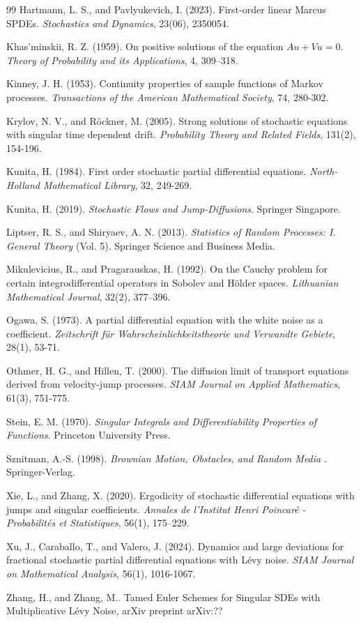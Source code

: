 \documentclass[12pt,oneside, reqno]{amsart}
\numberwithin{equation}{section}
\begin{document}
\begin{thebibliography}{99}
	 Hartmann, L. S., and Pavlyukevich, I. (2023). First-order linear Marcus SPDEs.  {\it Stochastics and Dynamics}, 23(06), 2350054.
	
	 Khas'minskii, R. Z. (1959). On positive solutions of the equation $Au + Vu = 0$. {\it Theory of Probability and its Applications}, 4, 309–318.
	
	 Kinney, J. H. (1953). Continuity properties of sample functions of Markov processes. {\it Transactions of the American Mathematical Society}, 74, 280-302.
	
	 Krylov, N. V., and R\"{o}ckner, M. (2005). Strong solutions of stochastic equations with singular time dependent drift. {\it Probability Theory and Related Fields}, 131(2), 154-196.
	
	 Kunita, H. (1984). First order stochastic partial differential equations. {\it North-Holland Mathematical Library}, 32, 249-269. 
	
	 Kunita, H. (2019). {\it Stochastic Flows and Jump-Diffusions}. Springer Singapore.
	
	 Liptser, R. S., and Shiryaev, A. N. (2013). {\it Statistics of Random Processes: I. General Theory} (Vol. 5). Springer Science and Business Media.
	
	 Mikulevicius, R., and Pragarauskas, H. (1992). On the Cauchy problem for certain integrodifferential operators in Sobolev and Hölder spaces.  {\it Lithuanian Mathematical Journal}, 32(2), 377–396.
	
	 Ogawa, S. (1973). A partial differential equation with the white noise as a coefficient. {\it Zeitschrift f\"{u}r Wahrscheinlichkeitstheorie und Verwandte Gebiete}, 28(1), 53-71.
	
	 Othmer, H. G., and Hillen, T. (2000). The diffusion limit of transport equations derived from velocity-jump processes. {\it SIAM Journal on Applied Mathematics}, 61(3), 751-775.
	
	 Stein, E. M. (1970). {\it Singular Integrals and Differentiability Properties of Functions}. Princeton University Press.
	
	 Sznitman, A.-S. (1998). {\it Brownian Motion, Obstacles, and Random Media }. Springer-Verlag.
	
	 Xie, L., and Zhang, X. (2020). Ergodicity of stochastic differential equations with jumps and singular coefficients. {\it Annales de l'Institut Henri Poincar\'{e} - Probabilit\'{e}s et Statistiques}, 56(1), 175–229.
	
	 Xu, J., Caraballo, T., and Valero, J. (2024). Dynamics and large deviations for fractional stochastic partial differential equations with L\'{e}vy noise. {\it SIAM Journal on Mathematical Analysis}, 56(1), 1016-1067.
	
	 Zhang, H., and Zhang, M.. Tamed Euler Schemes for Singular SDEs with Multiplicative L\'evy Noise, arXiv preprint arXiv:??
\end{thebibliography}
\end{document}
